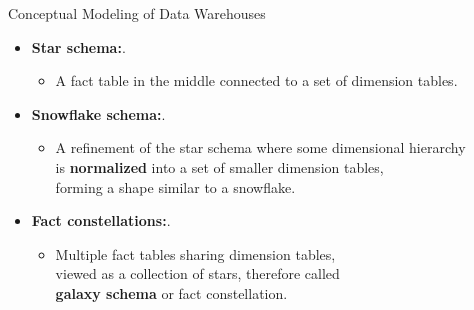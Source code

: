 \begin{frame}{Conceptual Modeling of Data Warehouses}
	\begin{itemize}
		\item \textbf{Star schema:}.
		      \begin{itemize}
			      \item A fact table in the middle connected to a set of dimension tables.
		      \end{itemize}
		\item \textbf{Snowflake schema:}.
		      \begin{itemize}
			      \item A refinement of the star schema where some dimensional hierarchy \\
			            is \textbf{normalized} into a set of smaller dimension tables,\\
			            forming a shape similar to a snowflake.
		      \end{itemize}
		\item \textbf{Fact constellations:}.
		      \begin{itemize}
			      \item Multiple fact tables sharing dimension tables, \\
			            viewed as a collection of stars, therefore called \\
			            \textbf{galaxy schema} or fact constellation.
		      \end{itemize}
	\end{itemize}
\end{frame}

